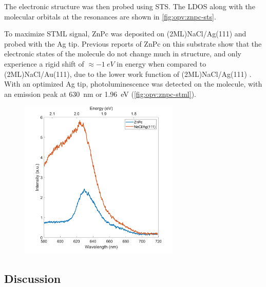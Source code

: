 \begin{figure} [h]
    \centering
    \caption{}
    \label{fig:opv:znpc-stm}
\end{figure}

The electronic structure was then probed using \ac{STS}. The \ac{LDOS} along with the molecular orbitals at the resonances are shown in \autoref{fig:opv:znpc-sts}.

\begin{figure} [h]
    \centering
    \caption{}
    \label{fig:opv:znpc-sts}
\end{figure}

To maximize \ac{STML} signal, ZnPc was deposited on (2ML)NaCl/Ag(111) and probed with the Ag tip. Previous reports of ZnPc on this substrate show that the electronic states of the molecule do not change much in structure, and only experience a rigid shift of $\approx \SI{-1}{eV}$ in energy when compared to (2ML)NaCl/Au(111), due to the lower work function of (2ML)NaCl/Ag(111) \citep{Doppagne2017,Doppagne2018}. With an optimized Ag tip, photoluminescence was detected on the molecule, with an emission peak at \SI{630}{nm} or \SI{1.96}{eV} (\autoref{fig:opv:znpc-stml}).


\begin{figure} [h]
    \centering
    \includegraphics[width=3in]{pictures/stml_znpc_ag111.png}
    \caption{}
    \label{fig:opv:znpc-stml}
\end{figure}

\subsection{Discussion}


